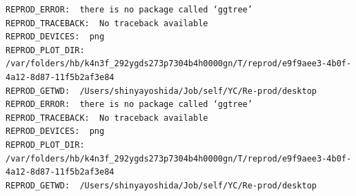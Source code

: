 \documentclass[
  11pt,
]{article}
\newenvironment{Shaded}{\begin{snugshade}}{\end{snugshade}}
\newcommand{\AttributeTok}[1]{\textcolor[rgb]{0.13,0.29,0.53}{#1}}
\newcommand{\CommentTok}[1]{\textcolor[rgb]{0.56,0.35,0.01}{\textit{#1}}}
\newcommand{\DecValTok}[1]{\textcolor[rgb]{0.00,0.00,0.81}{#1}}
\newcommand{\DocumentationTok}[1]{\textcolor[rgb]{0.56,0.35,0.01}{\textbf{\textit{#1}}}}
\newcommand{\FunctionTok}[1]{\textcolor[rgb]{0.13,0.29,0.53}{\textbf{#1}}}
\newcommand{\NormalTok}[1]{#1}
\newcommand{\OtherTok}[1]{\textcolor[rgb]{0.56,0.35,0.01}{#1}}
\newcommand{\SpecialCharTok}[1]{\textcolor[rgb]{0.81,0.36,0.00}{\textbf{#1}}}
\newcommand{\StringTok}[1]{\textcolor[rgb]{0.31,0.60,0.02}{#1}}
\newenvironment{rpoutput}{\vspace{0.5em}\begin{snugshade}}{\end{snugshade}}
\begin{document}
\begin{Shaded}
\end{Shaded}

\begin{rpoutput}

\begin{verbatim}
REPROD_ERROR:  there is no package called ‘ggtree’ 
REPROD_TRACEBACK:  No traceback available  
REPROD_DEVICES:  png 
REPROD_PLOT_DIR:  /var/folders/hb/k4n3f_292ygds273p7304b4h0000gn/T/reprod/e9f9aee3-4b0f-4a12-8d87-11f5b2af3e84 
REPROD_GETWD:  /Users/shinyayoshida/Job/self/YC/Re-prod/desktop 
REPROD_ERROR:  there is no package called ‘ggtree’ 
REPROD_TRACEBACK:  No traceback available  
REPROD_DEVICES:  png 
REPROD_PLOT_DIR:  /var/folders/hb/k4n3f_292ygds273p7304b4h0000gn/T/reprod/e9f9aee3-4b0f-4a12-8d87-11f5b2af3e84 
REPROD_GETWD:  /Users/shinyayoshida/Job/self/YC/Re-prod/desktop 
\end{verbatim}

\end{rpoutput}
\end{document}
